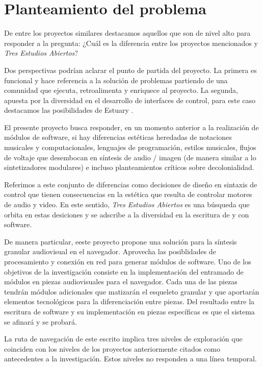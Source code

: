 \section*{Planteamiento del problema}

De entre los proyectos similares destacamos aquellos que son de nivel alto para responder a la pregunta: ¿Cuál es la diferencia entre los proyectos mencionados y \textit{Tres Estudios Abiertos}?

Dos perspectivas podrían aclarar el punto de partida del proyecto. La primera es funcional y hace referencia a la solución de problemas partiendo de una comunidad que ejecuta, retroalimenta y enriquece al proyecto. La segunda, apuesta por la diversidad en el desarrollo de interfaces de control, para este caso destacamos las posibilidades de Estuary \citep{estuary}.

El presente proyecto busca responder, en un momento anterior a la realización de módulos de software, si hay diferencias estéticas heredadas de notaciones musicales y computacionales, lenguajes de programación,  estilos musicales, flujos de voltaje que desembocan en síntesis de audio / imagen (de manera similar a lo sintetizadores modulares) e incluso planteamientos críticos sobre decolonialidad.

Referimos a este conjunto de diferencias como decisiones de diseño en sintaxis de control que tienen consecuencias en la estética que resulta de controlar motores de audio y video. En este sentido, \textit{Tres Estudios Abiertos} es una búsqueda que orbita en estas desiciones y se adscribe a la diversidad en la escritura de y con software. 

De manera particular, eeste proyecto propone una solución para la síntesis granular audiovisual en el navegador. Aprovecha las posiblidades de procesamiento y conexión en red para generar módulos de software. Uno de los objetivos de la investigación consiste en la implementación del entramado de módulos en piezas audiovisuales para el navegador. Cada una de las piezas tendrán módulos adicionales que matizarán el esqueleto granular y que aportarán elementos tecnológicos para la diferenciación entre piezas. Del resultado entre la escritura de software y su implementación en piezas específicas es que el sistema se afinará y se probará. 

La ruta de navegación de este escrito implica tres niveles de exploración que coinciden con los niveles de los proyectos anteriormente citados como antecedentes a la investigación. Estos niveles no responden a una línea temporal.  

